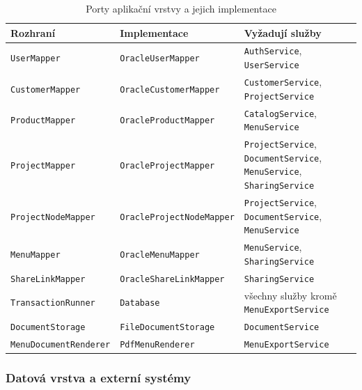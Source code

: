 \begin{table}[H]
\centering
\small
\begin{tabularx}{\textwidth}{ll>{\raggedright\arraybackslash}X}
\toprule
\textbf{Rozhraní} & \textbf{Implementace} & \textbf{Vyžadují služby} \\
\midrule
\texttt{UserMapper} & \texttt{OracleUserMapper} & \texttt{AuthService}, \texttt{UserService} \\
\texttt{CustomerMapper} & \texttt{OracleCustomerMapper} & \texttt{CustomerService}, \texttt{ProjectService} \\
\texttt{ProductMapper} & \texttt{OracleProductMapper} & \texttt{CatalogService}, \texttt{MenuService} \\
\texttt{ProjectMapper} & \texttt{OracleProjectMapper} & \texttt{ProjectService}, \texttt{DocumentService}, \texttt{MenuService}, \texttt{SharingService} \\
\texttt{ProjectNodeMapper} & \texttt{OracleProjectNodeMapper} & \texttt{ProjectService}, \texttt{DocumentService}, \texttt{MenuService} \\
\texttt{MenuMapper} & \texttt{OracleMenuMapper} & \texttt{MenuService}, \texttt{SharingService} \\
\texttt{ShareLinkMapper} & \texttt{OracleShareLinkMapper} & \texttt{SharingService} \\
\texttt{TransactionRunner} & \texttt{Database} & všechny služby kromě \texttt{MenuExportService} \\
\texttt{DocumentStorage} & \texttt{FileDocumentStorage} & \texttt{DocumentService} \\
\texttt{MenuDocumentRenderer} & \texttt{PdfMenuRenderer} & \texttt{MenuExportService} \\
\bottomrule
\end{tabularx}
\caption{Porty aplikační vrstvy a jejich implementace}
\label{tab:porty}
\end{table}

\subsubsection*{Datová vrstva a externí systémy}

